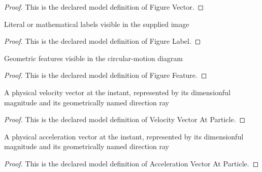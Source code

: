 \begin{proof}
  This is the declared model definition of Figure Vector.
\end{proof}
\begin{definition}
  \label{def:physics:phyx-mini-0688:phyxminiproblems-problemphyxmini0688-figurelabel}
  Literal or mathematical labels visible in the supplied image
\end{definition}
\begin{proof}
  This is the declared model definition of Figure Label.
\end{proof}
\begin{definition}
  \label{def:physics:phyx-mini-0688:phyxminiproblems-problemphyxmini0688-figurefeature}
  Geometric features visible in the circular-motion diagram
\end{definition}
\begin{proof}
  This is the declared model definition of Figure Feature.
\end{proof}
\begin{definition}
  \label{def:physics:phyx-mini-0688:phyxminiproblems-problemphyxmini0688-velocityvectoratparticle}
  A physical velocity vector at the instant, represented by its dimensionful magnitude and its geometrically named direction ray
\end{definition}
\begin{proof}
  This is the declared model definition of Velocity Vector At Particle.
\end{proof}
\begin{definition}
  \label{def:physics:phyx-mini-0688:phyxminiproblems-problemphyxmini0688-accelerationvectoratparticle}
  A physical acceleration vector at the instant, represented by its dimensionful magnitude and its geometrically named direction ray
\end{definition}
\begin{proof}
  This is the declared model definition of Acceleration Vector At Particle.
\end{proof}
